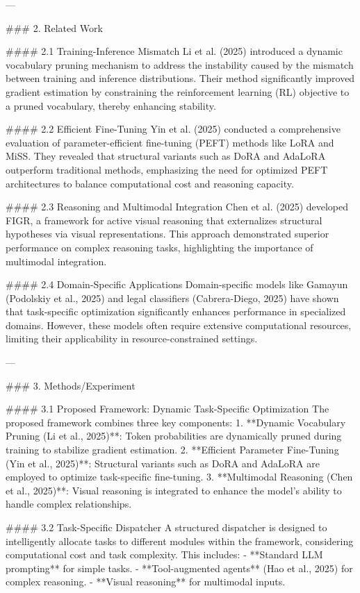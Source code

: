 ---

### 2. Related Work  

#### 2.1 Training-Inference Mismatch  
Li et al. (2025) introduced a dynamic vocabulary pruning mechanism to address the instability caused by the mismatch between training and inference distributions. Their method significantly improved gradient estimation by constraining the reinforcement learning (RL) objective to a pruned vocabulary, thereby enhancing stability.

#### 2.2 Efficient Fine-Tuning  
Yin et al. (2025) conducted a comprehensive evaluation of parameter-efficient fine-tuning (PEFT) methods like LoRA and MiSS. They revealed that structural variants such as DoRA and AdaLoRA outperform traditional methods, emphasizing the need for optimized PEFT architectures to balance computational cost and reasoning capacity.

#### 2.3 Reasoning and Multimodal Integration  
Chen et al. (2025) developed FIGR, a framework for active visual reasoning that externalizes structural hypotheses via visual representations. This approach demonstrated superior performance on complex reasoning tasks, highlighting the importance of multimodal integration.

#### 2.4 Domain-Specific Applications  
Domain-specific models like Gamayun (Podolskiy et al., 2025) and legal classifiers (Cabrera-Diego, 2025) have shown that task-specific optimization significantly enhances performance in specialized domains. However, these models often require extensive computational resources, limiting their applicability in resource-constrained settings.

---

### 3. Methods/Experiment  

#### 3.1 Proposed Framework: Dynamic Task-Specific Optimization  
The proposed framework combines three key components:  
1. **Dynamic Vocabulary Pruning (Li et al., 2025)**: Token probabilities are dynamically pruned during training to stabilize gradient estimation.  
2. **Efficient Parameter Fine-Tuning (Yin et al., 2025)**: Structural variants such as DoRA and AdaLoRA are employed to optimize task-specific fine-tuning.  
3. **Multimodal Reasoning (Chen et al., 2025)**: Visual reasoning is integrated to enhance the model's ability to handle complex relationships.

#### 3.2 Task-Specific Dispatcher  
A structured dispatcher is designed to intelligently allocate tasks to different modules within the framework, considering computational cost and task complexity. This includes:  
- **Standard LLM prompting** for simple tasks.  
- **Tool-augmented agents** (Hao et al., 2025) for complex reasoning.  
- **Visual reasoning** for multimodal inputs.

